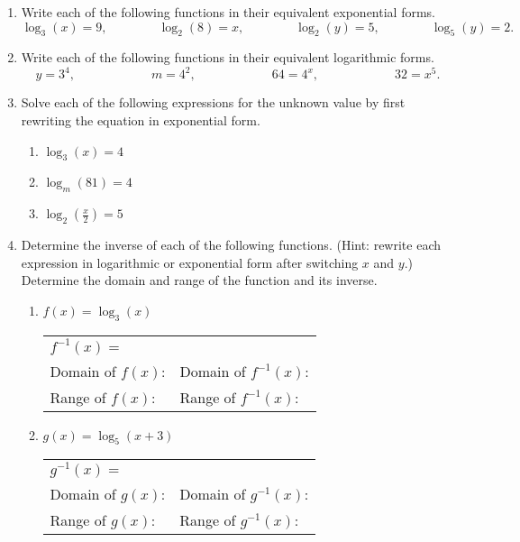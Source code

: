 \begin{enumerate}
\item Write each of the following functions in their equivalent  exponential forms.
  $$\log_3(x)=9,   \quad \quad \quad \quad
  \log_2(8)=x,     \quad \quad \quad \quad
  \log_2(y)=5,     \quad \quad  \quad \quad
  \log_5(y)=2.$$
\vfill
\item Write each of the following functions in their equivalent  logarithmic forms.
  $$y=3^4,  \quad \quad \quad \quad \quad \quad
  m=4^2,    \quad \quad \quad \quad \quad \quad
  64=4^x,   \quad \quad \quad \quad  \quad \quad
  32=x^5.$$
\vfill
\item Solve each of the following expressions for the unknown value by
  first rewriting the equation in exponential form.
\begin{enumerate}
\item $\log_3(x)=4$
\vfill
\vfill
\item $\log_{m}(81)=4$
\vfill
\vfill
\item $\displaystyle \log_2\left(\frac{x}{2}\right)=5$
\vfill
\vfill
\end{enumerate}



\clearpage
\item Determine the inverse of each of the following functions.
  (Hint: rewrite each expression in logarithmic or exponential form
  after switching $x$ and $y$.)  Determine the domain and range of the
  function and its inverse.
\begin{enumerate}
\item $f(x)=\log_3(x)$

  \vfill
  
  \begin{tabular}{p{}p{}}
    $f^{-1}(x) = $ & \\ [1em]
    Domain of $f(x)$:  & Domain of $f^{-1}(x)$: \\ [1em]
    Range of $f(x)$:   & Range of $f^{-1}(x)$:  \\ [1em]
  \end{tabular}
  
\item $g(x)=\log_5(x+3)$

  \vfill
  
  \begin{tabular}{p{}p{}}
    $g^{-1}(x) = $ & \\ [1em]
    Domain of $g(x)$:  & Domain of $g^{-1}(x)$: \\ [1em]
    Range of $g(x)$:   & Range of $g^{-1}(x)$:  \\ [1em]
  \end{tabular}
  

\end{enumerate}
\end{enumerate}
